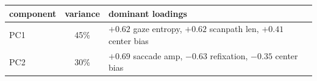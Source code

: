 \begin{tabular}{lcl}
\toprule
component & variance & dominant loadings \\
\midrule
PC1 & 45\% & $+0.62$ gaze entropy, $+0.62$ scanpath len, $+0.41$ center bias \\
PC2 & 30\% & $+0.69$ saccade amp, $-0.63$ refixation, $-0.35$ center bias \\
\bottomrule
\end{tabular}
